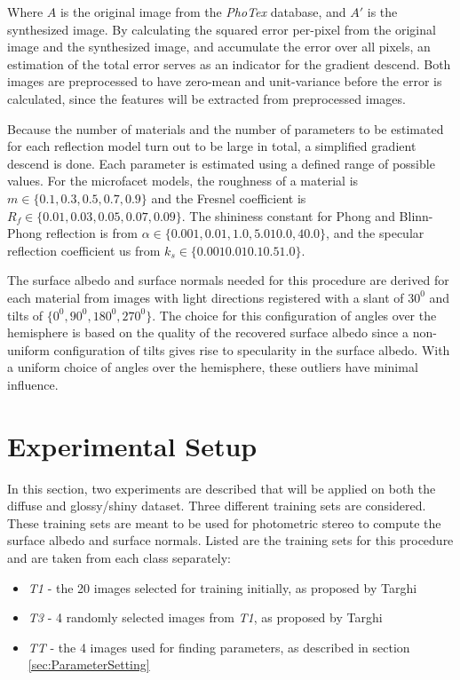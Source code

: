 Where $A$ is the original image from the {\it PhoTex} database, and $A'$ is the synthesized image. By calculating the squared error per-pixel from the original image and the synthesized image, and accumulate the error over all pixels, an estimation of the total error serves as an indicator for the gradient descend. Both images are preprocessed to have zero-mean and unit-variance before the error is calculated, since the features will be extracted from preprocessed images.

Because the number of materials and the number of parameters to be estimated for each reflection model turn out to be large in total, a simplified gradient descend is done. Each parameter is estimated using a defined range of possible values. For the microfacet models, the roughness of a material is $m \in \{0.1, 0.3, 0.5, 0.7, 0.9\}$ and the Fresnel coefficient is $R_f \in \{0.01, 0.03, 0.05, 0.07, 0.09\}$. The shininess constant for Phong and Blinn-Phong reflection is from $\alpha \in \{0.001, 0.01, 1.0, 5.0 10.0, 40.0\}$, and the specular reflection coefficient us from $k_s \in \{0.001 0.01 0.1 0.5 1.0\}$. 

The surface albedo and surface normals needed for this procedure are derived for each material from images with light directions registered with a slant of $30^0$ and tilts of $\{0^0, 90^0, 180^0, 270^0\}$. The choice for this configuration of angles over the hemisphere is based on the quality of the recovered surface albedo since a non-uniform configuration of tilts gives rise to specularity in the surface albedo. With a uniform choice of angles over the hemisphere, these outliers have minimal influence.


\section{Experimental Setup}\label{sec:Experiments}
In this section, two experiments are described that will be applied on both the diffuse and glossy/shiny dataset. Three different training sets are considered. These training sets are meant to be used for photometric stereo to compute the surface albedo and surface normals. Listed are the training sets for this procedure and are taken from each class separately:

\begin{itemize}
	\item{\textit{T1} - the 20 images selected for training initially, as proposed by Targhi}
	\item{\textit{T3} - 4 randomly selected images from \textit{T1}, as proposed by Targhi}
	\item{\textit{TT} - the 4 images used for finding parameters, as described in section \ref{sec:ParameterSetting}}
\end{itemize}

